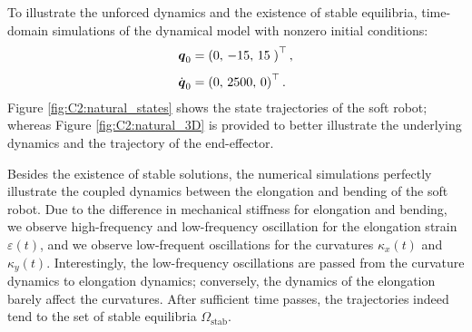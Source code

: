 To illustrate the unforced dynamics and the existence of stable equilibria, time-domain simulations of the dynamical model with nonzero initial conditions:
%
\begin{align*}
{\boldsymbol{q}}_0 & = \left(0,\,-15,\,15\; \right)^\top, \\[0.35em] {\dot{\boldsymbol{q}}}_0 & = \left(0,\,2500,\,0 \right)^\top.
\end{align*}
%
Figure \ref{fig:C2:natural_states} shows the state trajectories of the soft robot; whereas Figure \ref{fig:C2:natural_3D} is provided to better illustrate the underlying dynamics and the trajectory of the end-effector.
%

Besides the existence of stable solutions, the numerical simulations perfectly illustrate the coupled dynamics between the elongation and bending of the soft robot. Due to the difference in mechanical stiffness for elongation and bending, we observe high-frequency and low-frequency oscillation for the elongation strain $\varepsilon(t)$, and we observe low-frequent oscillations for the curvatures $\kappa_x(t)$ and $\kappa_y(t)$. Interestingly, the low-frequency oscillations are passed from the curvature dynamics to elongation dynamics; conversely, the dynamics of the elongation barely affect the curvatures. After sufficient time passes, the trajectories indeed tend to the set of stable equilibria $\Omega_{\textrm{stab}}$.

